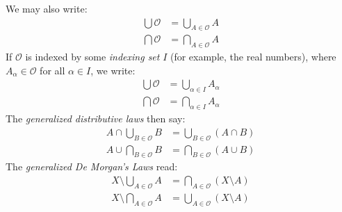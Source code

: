 \documentclass{article}
\theoremstyle{plain}
\theoremstyle{normal}
\begin{document}
        We may also write:
        \begin{align}
            \bigcup\mathcal{O}&=\bigcup_{A\in\mathcal{O}}A\\
            \bigcap\mathcal{O}&=\bigcap_{A\in\mathcal{O}}A
        \end{align}
        If $\mathcal{O}$ is indexed by some \textit{indexing set} $I$
        (for example, the real numbers), where $A_{\alpha}\in\mathcal{O}$
        for all $\alpha\in{I}$, we write:
        \begin{align}
            \bigcup\mathcal{O}&=\bigcup_{\alpha\in{I}}A_{\alpha}\\
            \bigcap\mathcal{O}&=\bigcap_{\alpha\in{I}}A_{\alpha}
        \end{align}
        The \textit{generalized distributive laws} then say:
        \begin{align}
            A\cap\bigcup_{B\in\mathcal{O}}B
                &=\bigcup_{B\in\mathcal{O}}(A\cap{B})\\
            A\cup\bigcap_{B\in\mathcal{O}}B
                &=\bigcap_{B\in\mathcal{O}}(A\cup{B})
        \end{align}
        The \textit{generalized De Morgan's Laws} read:
        \begin{align}
            X\setminus\bigcup_{A\in\mathcal{O}}A
                &=\bigcap_{A\in\mathcal{O}}(X\setminus{A})\\
            X\setminus\bigcap_{A\in\mathcal{O}}A
                &=\bigcup_{A\in\mathcal{O}}(X\setminus{A})
        \end{align}
\end{document}
